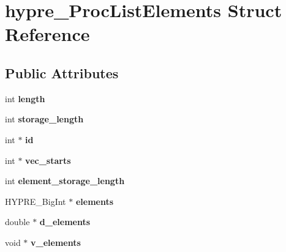 \hypertarget{structhypre__ProcListElements}{}\section{hypre\+\_\+\+Proc\+List\+Elements Struct Reference}
\label{structhypre__ProcListElements}
\subsection*{Public Attributes}
\begin{DoxyCompactItemize}
\item 
\hypertarget{structhypre__ProcListElements_a0fe8c4938f267bfbda189dd58713063f}{}int {\bfseries length}\label{structhypre__ProcListElements_a0fe8c4938f267bfbda189dd58713063f}

\item 
\hypertarget{structhypre__ProcListElements_aee745c0491a2c51b012819cf172dd79d}{}int {\bfseries storage\+\_\+length}\label{structhypre__ProcListElements_aee745c0491a2c51b012819cf172dd79d}

\item 
\hypertarget{structhypre__ProcListElements_ab251b31c5120e0682057d754f85eeb4c}{}int $\ast$ {\bfseries id}\label{structhypre__ProcListElements_ab251b31c5120e0682057d754f85eeb4c}

\item 
\hypertarget{structhypre__ProcListElements_a5787e2f101c70211500b6e2f166a63bd}{}int $\ast$ {\bfseries vec\+\_\+starts}\label{structhypre__ProcListElements_a5787e2f101c70211500b6e2f166a63bd}

\item 
\hypertarget{structhypre__ProcListElements_a7c46b9e1d6d85fd79b7ca8dba3c3e35c}{}int {\bfseries element\+\_\+storage\+\_\+length}\label{structhypre__ProcListElements_a7c46b9e1d6d85fd79b7ca8dba3c3e35c}

\item 
\hypertarget{structhypre__ProcListElements_ac52bef6306566bafcb692c1c5609eba1}{}H\+Y\+P\+R\+E\+\_\+\+Big\+Int $\ast$ {\bfseries elements}\label{structhypre__ProcListElements_ac52bef6306566bafcb692c1c5609eba1}

\item 
\hypertarget{structhypre__ProcListElements_a125563c1c564b606b7e47e4e422f0ac2}{}double $\ast$ {\bfseries d\+\_\+elements}\label{structhypre__ProcListElements_a125563c1c564b606b7e47e4e422f0ac2}

\item 
\hypertarget{structhypre__ProcListElements_af50963a6a81619657fffdc2222dc35b5}{}void $\ast$ {\bfseries v\+\_\+elements}\label{structhypre__ProcListElements_af50963a6a81619657fffdc2222dc35b5}

\end{DoxyCompactItemize}


